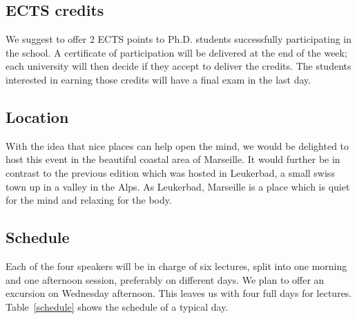 \documentclass[a4paper]{scrartcl}
\begin{document}
\subsection{ECTS credits}

We suggest to offer 2 ECTS points to Ph.D. students successfully participating
in the school. A certificate of participation will be delivered at the end of
the week; each university will then decide if they accept to deliver the
credits. The students interested in earning those credits will have a final exam
in the last day.


\subsection{Location}

With the idea that nice places can help open the mind, we would be delighted to
host this event in the beautiful coastal area of Marseille. It would further be
in contrast to the previous edition which was hosted in Leukerbad, a small swiss
town up in a valley in the Alps. As Leukerbad, Marseille is a place which is
quiet for the mind and relaxing for the body. 

\subsection{Schedule}

Each of the four speakers will be in charge of six lectures, split into one
morning and one afternoon session, preferably on different days. We plan to
offer an excursion on Wednesday afternoon. This leaves us with four full days
for lectures. Table~\ref{schedule} shows the schedule of a typical day.
\end{document}
